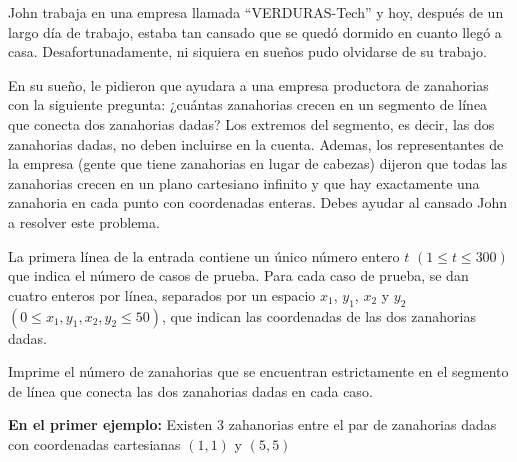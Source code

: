 
John trabaja en una empresa llamada ``VERDURAS-Tech'' y hoy, después de un largo día de trabajo, estaba tan cansado que se quedó dormido en cuanto llegó a casa. Desafortunadamente, ni siquiera en sueños pudo olvidarse de su trabajo. 

En su sueño, le pidieron que ayudara a una empresa productora de zanahorias con la siguiente pregunta: ¿cuántas zanahorias crecen en un segmento de línea que conecta dos zanahorias dadas? Los extremos del segmento, es decir, las dos zanahorias dadas, no deben incluirse en la cuenta. Ademas, los representantes de la empresa (gente que tiene zanahorias en lugar de cabezas) dijeron que todas las zanahorias crecen en un plano cartesiano infinito y que hay exactamente una zanahoria en cada punto con coordenadas enteras. Debes ayudar al cansado John a resolver este problema.


La primera línea de la entrada contiene un único número entero $t$ $(1 \le t \le 300)$ que indica el número de casos de prueba. Para cada caso de prueba, se dan cuatro enteros por línea, separados por un espacio $x_1$, $y_1$, $x_2$ y $y_2$ $(0 \leq x_1, y_1, x_2, y_2 \leq 50)$, que indican las coordenadas de las dos zanahorias dadas.

\outputText

Imprime el número de zanahorias que se encuentran estrictamente en el segmento de línea que conecta las dos zanahorias dadas en cada caso.

\exampleCases

\begin{example}
\end{example}

\explanationText

\textbf{En el primer ejemplo:} Existen $3$ zahanorias entre el par de zanahorias dadas con coordenadas cartesianas $(1,1)$ y $(5, 5)$

\begin{figure}[h]
    \centering
    
\end{figure}